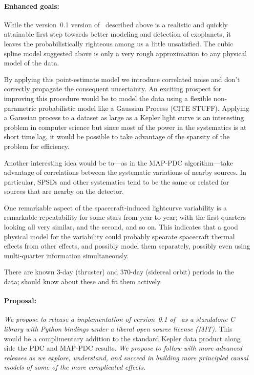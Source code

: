 \documentclass[letterpaper,12pt,preprint]{hack_aastex}
\newcommand{\Untrendy}{\package{Untrendy}}
\begin{document}
\paragraph{Enhanced goals:}
While the version~0.1 version of \Untrendy\ described above is a realistic and
quickly attainable first step towards better modeling and detection of
exoplanets, it leaves the probabilistically
righteous among us a little unsatisfied.
The cubic spline model suggested above is only a very rough approximation to
any physical model of the data.

By applying this
point-estimate model we introduce correlated noise and don't
correctly propagate the consequent uncertainty.
An exciting prospect for improving this procedure would be to model the data
using a flexible non-parametric probabilistic model like a Gaussian Process
 (CITE STUFF).
Applying a Gaussian process to a dataset as large as a Kepler light curve is
an interesting problem in computer science but since most of the power in the
systematics is at short time lag, it would be possible to take advantage of
the sparsity of the problem for efficiency.

Another interesting idea would be to---as in the MAP-PDC
algorithm---take advantage of correlations between the systematic
variations of nearby sources.  In particular, SPSDs and other
systematics tend to be the same or related for sources that are nearby
on the detector.

One remarkable aspect of the spacecraft-induced lightcurve variability is
a remarkable repeatability for some stars from year to year; with the
first quarters looking all very similar, and the second, and so on.
This indicates that a good physical model for the variability could probably
spearate spacecraft thermal effects from other effects, and possibly model
them separately, possibly even using multi-quarter information simultaneously.

There are known 3-day (thruster) and 370-day (sidereal orbit) periods
in the data; \Untrendy should know about these and fit them actively.

\paragraph{Proposal:}
\emph{We propose to release a implementation of version~0.1 of \Untrendy\ as a standalone C
library with Python bindings under a liberal open source license (MIT).}
This would be a complimentary addition to the standard Kepler data
product along side the PDC and MAP-PDC results.
\emph{We propose to follow with more advanced releases as we explore,
understand, and succeed in building more principled causal models of some
of the more complicated effects.}
\end{document}
